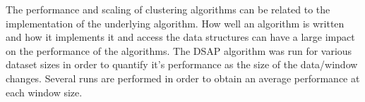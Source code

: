 

The performance and scaling of clustering algorithms can be related to the implementation of the underlying algorithm. How well an algorithm is written and how it implements it and access the data structures can have a large impact on the performance of the algorithms. The DSAP algorithm was run for various dataset sizes in order to quantify it's performance as the size of the data/window changes. Several runs are performed in order to obtain an average performance at each window size.

